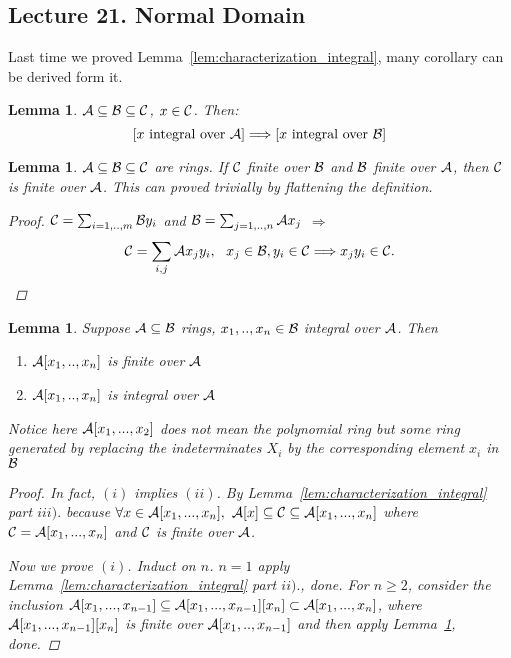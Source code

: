\documentclass[11pt]{article}
\newtheorem{lemma}[thm]{Lemma}
\newcommand{\cala}{{\cal A}}
\newcommand{\calb}{{\cal B}}
\newcommand{\calc}{{\cal C}}
\newcommand{\Lrta}{\Longrightarrow}
\begin{document}
\subsection{Lecture 21. Normal Domain}
Last time we proved Lemma~\ref{lem:characterization_integral}, many corollary can be derived form it.
\begin{lemma}\label{lem:integral_lemma2}
$\cala\subseteq\calb\subseteq \calc$, $x\in\calc$. Then:
$$
[x\text{ integral over }\cala]\Lrta [x\text{ integral over }\calb]
$$
\end{lemma}
\begin{lemma}\label{lem:integral_lemma3}
$\cala\subseteq\calb\subseteq \calc$ are rings. If $\calc$ finite over $\calb$ and $\calb$ finite over $\cala$, then $\calc$ is finite over $\cala$. This can proved trivially by flattening the definition.
\begin{proof}
$\calc=\sum_{i=1,..,m}\calb y_i$ and $\calb=\sum_{j=1,..,n}\cala x_j$ $\Lrta$
$$
\calc=\sum_{i,j}\cala x_j y_i,\ \ x_j\in \calb,y_i\in\calc\Lrta x_j y_i\in \calc.
$$
\end{proof}

\end{lemma}

\begin{lemma}\label{lem:integral_lemma4}
Suppose $\cala\subseteq \calb$ rings, $x_1,..,x_n\in\calb$ integral over $\cala$. Then
\begin{enumerate}[label=(\roman*)]
 \item  $\cala[x_1,..,x_n]$ is finite over $\cala$
 \item $\cala[x_1,..,x_n]$ is integral over $\cala$
\end{enumerate}
{\color{red} Notice here $\cala[x_1,...,x_2]$ does not mean the polynomial ring but some ring generated by replacing the indeterminates $X_i$ by the corresponding element $x_i$ in $\calb$}
\begin{proof}
In fact, $(i)$ implies $(ii)$. 
By Lemma~\ref{lem:characterization_integral} part $iii).$ because $\forall x\in\cala[x_1,...,x_n],$ $ \cala[x]\subseteq \calc\subseteq \cala[x_1,...,x_n]$ where $\calc=\cala[x_1,...,x_n]$ and $\calc$ is finite over $\cala$.

Now we prove $(i)$. Induct on $n$. $n=1$ apply Lemma~\ref{lem:characterization_integral} part $ii).$, done. 
For $n\geq 2$, consider the inclusion $\cala[x_1,...,x_{n-1}]\subseteq \cala[x_1,...,x_{n-1}][x_n]\subset\cala[x_1,...,x_n]$, where $\cala[x_1,...,x_{n-1}][x_n]$ is finite over $\cala[x_1,..,x_{n-1}]$ and then apply Lemma~\ref{lem:integral_lemma3}, done.
\end{proof}
\end{lemma}
\end{document}
